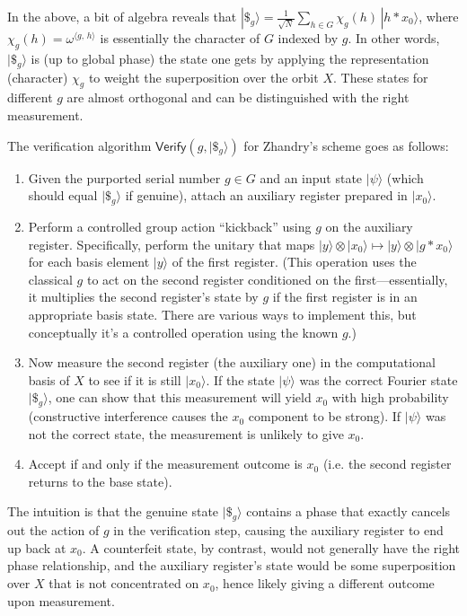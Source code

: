 \documentclass[11pt]{article}
\theoremstyle{definition}
\begin{document}
In the above, a bit of algebra reveals that $|\$_g\rangle = \frac{1}{\sqrt{N}} \sum_{h \in G} \chi_g(h)\, |h * x_0\rangle$, where $\chi_g(h) = \omega^{\langle g,\,h \rangle}$ is essentially the character of $G$ indexed by $g$. In other words, $|\$_g\rangle$ is (up to global phase) the state one gets by applying the representation (character) $\chi_g$ to weight the superposition over the orbit $X$. These states for different $g$ are almost orthogonal and can be distinguished with the right measurement.

The verification algorithm $\mathsf{Verify}(g, |\$_g\rangle)$ for Zhandry’s scheme goes as follows:
\begin{enumerate}
    \item Given the purported serial number $g \in G$ and an input state $|\psi\rangle$ (which should equal $|\$_g\rangle$ if genuine), attach an auxiliary register prepared in $|x_0\rangle$.
    \item Perform a controlled group action “kickback” using $g$ on the auxiliary register. Specifically, perform the unitary that maps $|y\rangle \otimes |x_0\rangle \mapsto |y\rangle \otimes |g * x_0 \rangle$ for each basis element $|y\rangle$ of the first register. (This operation uses the classical $g$ to act on the second register conditioned on the first—essentially, it multiplies the second register’s state by $g$ if the first register is in an appropriate basis state. There are various ways to implement this, but conceptually it’s a controlled operation using the known $g$.)
    \item Now measure the second register (the auxiliary one) in the computational basis of $X$ to see if it is still $|x_0\rangle$. If the state $|\psi\rangle$ was the correct Fourier state $|\$_g\rangle$, one can show that this measurement will yield $x_0$ with high probability (constructive interference causes the $x_0$ component to be strong). If $|\psi\rangle$ was not the correct state, the measurement is unlikely to give $x_0$.
    \item Accept if and only if the measurement outcome is $x_0$ (i.e. the second register returns to the base state).
\end{enumerate}

The intuition is that the genuine state $|\$_g\rangle$ contains a phase that exactly cancels out the action of $g$ in the verification step, causing the auxiliary register to end up back at $x_0$. A counterfeit state, by contrast, would not generally have the right phase relationship, and the auxiliary register’s state would be some superposition over $X$ that is not concentrated on $x_0$, hence likely giving a different outcome upon measurement.
\end{document}
